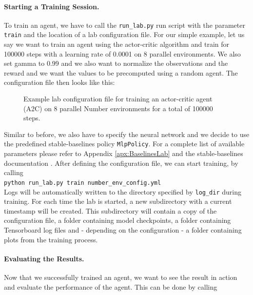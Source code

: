 \paragraph{Starting a Training Session.}
To train an agent, we have to call the \texttt{run\_lab.py} run script with the parameter \texttt{train} and the location of a lab configuration file. For our simple example, let us say we want to train an agent using the actor-critic algorithm and train for 100000 steps with a learning rate of 0.0001 on 8 parallel environments. We also set gamma to 0.99 and we also want to normalize the observations and the reward and we want the values to be precomputed using a random agent. The configuration file then looks like this:

\begin{figure}[h]
    
    \caption[Lab Configuration File for the Number Environment]{Example lab configuration file for training an actor-critic agent (A2C) on 8 parallel Number environments for a total of 100000 steps.}
    \label{fig:NumberEnvConfig}
\end{figure}

 Similar to before, we also have to specify the neural network and we decide to use the predefined stable-baselines policy \texttt{MlpPolicy}. For a complete list of available parameters please refer to Appendix \ref{apx:BaselinesLab} and the stable-baselines documentation \cite{stable-baselines-docs}. After defining the configuration file, we can start training, by calling \\ 

\texttt{python run\_lab.py train number\_env\_config.yml} \\ 

 \noindent Logs will be automatically written to the directory specified by \texttt{log\_dir} during training. For each time the lab is started, a new subdirectory with a current timestamp will be created. This subdirectory will contain a copy of the configuration file, a folder containing model checkpoints, a folder containing Tensorboard log files and - depending on the configuration - a folder containing plots from the training process. 

\paragraph{Evaluating the Results.}
Now that we successfully trained an agent, we want to see the result in action and evaluate the performance of the agent. This can be done by calling \\

